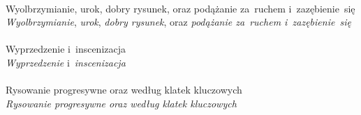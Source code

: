 \documentclass[a4paper,11pt]{article}
\numberwithin{equation}{section}
\begin{document}
\noindent
{} \\
\Jest Wyolbrzymianie, urok, dobry rysunek, oraz podążanie za~ruchem
i~zazębienie~się \\
\PowinnoByc \textit{Wyolbrzymianie}, \textit{urok}, \textit{dobry rysunek},
oraz \textit{podążanie za~ruchem i~zazębienie~się} \\
 \\
\Jest Wyprzedzenie i~inscenizacja \\
\PowinnoByc \textit{Wyprzedzenie} i~\textit{inscenizacja} \\
 \\
\Jest Rysowanie progresywne oraz według klatek kluczowych \\
\PowinnoByc \textit{Rysowanie progresywne oraz według klatek kluczowych} \\












\printbibliography





\end{document}
